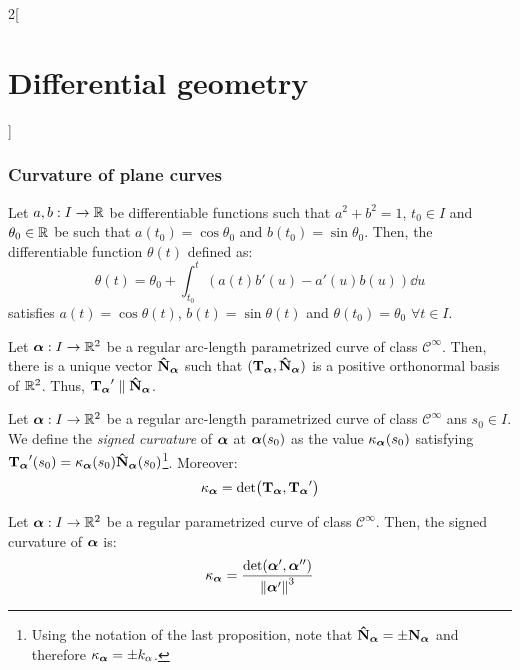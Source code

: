 \documentclass[../../../main.tex]{subfiles}
\begin{document}
\begin{multicols}{2}[\section{Differential geometry}]
  \subsubsection{Curvature of plane curves}
  \begin{lemma}
    Let $a,b:I\rightarrow\mathbb{R}$ be differentiable functions such that $a^2+b^2=1$, $t_0\in I$ and $\theta_0\in\mathbb{R}$ be such that $a(t_0)=\cos\theta_0$ and $b(t_0)=\sin\theta_0$. Then, the differentiable function $\theta(t)$ defined as:
    $$\theta(t)=\theta_0+\int_{t_0}^t\left(a(t)b'(u)-a'(u)b(u)\right)\dd{u}$$
    satisfies $a(t)=\cos\theta(t)$, $b(t)=\sin\theta(t)$ and $\theta(t_0)=\theta_0$ $\forall t\in I$.
  \end{lemma}
  \begin{proposition}
    Let $\boldsymbol{\mathrm{\alpha}}:I\rightarrow\mathbb{R}^2$ be a regular arc-length parametrized curve of class $\mathcal{C}^\infty$. Then, there is a unique vector $\boldsymbol{\mathrm{\hat{N}}}_{\boldsymbol{\mathrm{\alpha}}}$ such that $({\boldsymbol{\mathrm{T}}_{\boldsymbol{\mathrm{\alpha}}}},\boldsymbol{\mathrm{\hat{N}}}_{\boldsymbol{\mathrm{\alpha}}})$ is a positive orthonormal basis of $\mathbb{R}^2$. Thus, ${\boldsymbol{\mathrm{T}}_{\boldsymbol{\mathrm{\alpha}}}}'\parallel \boldsymbol{\mathrm{\hat{N}}}_{\boldsymbol{\mathrm{\alpha}}}$.
  \end{proposition}
  \begin{definition}
    Let $\boldsymbol{\mathrm{\alpha}}:I\rightarrow\mathbb{R}^2$ be a regular arc-length parametrized curve of class $\mathcal{C}^\infty$ ans $s_0\in I$. We define the \emph{signed curvature} of $\boldsymbol{\mathrm{\alpha}}$ at $\boldsymbol{\mathrm{\alpha}}(s_0)$ as the value ${\kappa_{\boldsymbol{\mathrm{\boldsymbol{\mathrm{\alpha}}}}}}(s_0)$ satisfying ${\boldsymbol{\mathrm{T}}_{\boldsymbol{\mathrm{\alpha}}}}'(s_0)={\kappa_{\boldsymbol{\mathrm{\boldsymbol{\mathrm{\alpha}}}}}}(s_0)\boldsymbol{\mathrm{\hat{N}}}_{\boldsymbol{\mathrm{\alpha}}}(s_0)$\footnote{Using the notation of the last proposition, note that $\boldsymbol{\mathrm{\hat{N}}}_{\boldsymbol{\mathrm{\alpha}}}=\pm{\boldsymbol{\mathrm{N}}_{\boldsymbol{\mathrm{\alpha}}}}$ and therefore ${\kappa_{\boldsymbol{\mathrm{\boldsymbol{\mathrm{\alpha}}}}}}=\pm k_\alpha$.}. Moreover: $${\kappa_{\boldsymbol{\mathrm{\boldsymbol{\mathrm{\alpha}}}}}}=\det({\boldsymbol{\mathrm{T}}_{\boldsymbol{\mathrm{\alpha}}}},{\boldsymbol{\mathrm{T}}_{\boldsymbol{\mathrm{\alpha}}}}')$$
  \end{definition}
  \begin{proposition}
    Let $\boldsymbol{\mathrm{\alpha}}:I\rightarrow\mathbb{R}^2$ be a regular parametrized curve of class $\mathcal{C}^\infty$. Then, the signed curvature of $\boldsymbol{\mathrm{\alpha}}$ is: $${\kappa_{\boldsymbol{\mathrm{\boldsymbol{\mathrm{\alpha}}}}}}=\frac{\det(\boldsymbol{\mathrm{\alpha}}',\boldsymbol{\mathrm{\alpha}}'')}{{\|\boldsymbol{\mathrm{\alpha}}'\|}^3}$$
  \end{proposition}

\end{multicols}
\end{document}
